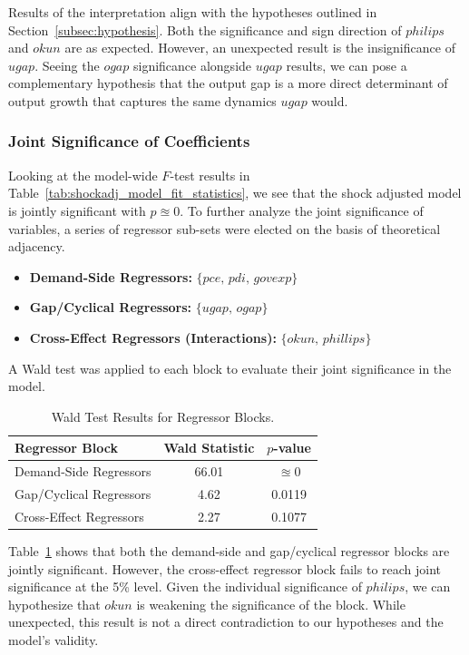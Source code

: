 \vspace{\baselineskip}
Results of the interpretation align with the hypotheses outlined in Section~\ref{subsec:hypothesis}.
Both the significance and sign direction of $philips$ and $okun$ are as expected.
However, an unexpected result is the insignificance of $ugap$.
Seeing the $ogap$ significance alongside $ugap$ results, we can pose a complementary hypothesis that the output gap is a more direct determinant of output growth that captures the same dynamics $ugap$ would.

\subsubsection{Joint Significance of Coefficients}\label{subsubsec:joint_significance}
Looking at the model-wide $F$-test results in Table~\ref{tab:shockadj_model_fit_statistics}, we see that the shock adjusted model is jointly significant with $p \approxeq 0$.
To further analyze the joint significance of variables, a series of regressor sub-sets were elected on the basis of theoretical adjacency.
\begin{itemize}
    \item \textbf{Demand-Side Regressors:} $\lbrace pce,\, pdi,\, govexp \rbrace$
    \item \textbf{Gap/Cyclical Regressors:} $\lbrace ugap,\, ogap\rbrace$
    \item \textbf{Cross-Effect Regressors (Interactions):} $\lbrace okun,\, phillips \rbrace$
\end{itemize}
\noindent A Wald test was applied to each block to evaluate their joint significance in the model.
\begin{table}[H]
    \centering
    \begin{tabular}{lcc}
        \toprule
        \textbf{Regressor Block} & \textbf{Wald Statistic} & \textbf{$p$-value} \\
        \midrule
        Demand-Side Regressors & 66.01 & $\approxeq 0$ \\
        Gap/Cyclical Regressors & 4.62 & 0.0119 \\
        Cross-Effect Regressors & 2.27 & 0.1077 \\
        \bottomrule
    \end{tabular}
    \caption{Wald Test Results for Regressor Blocks.}
    \label{tab:wald_test_results}
\end{table}

Table~\ref{tab:wald_test_results} shows that both the demand-side and gap/cyclical regressor blocks are jointly significant.
However, the cross-effect regressor block fails to reach joint significance at the 5\% level.
Given the individual significance of $philips$, we can hypothesize that $okun$ is weakening the significance of the block.
While unexpected, this result is not a direct contradiction to our hypotheses and the model's validity.